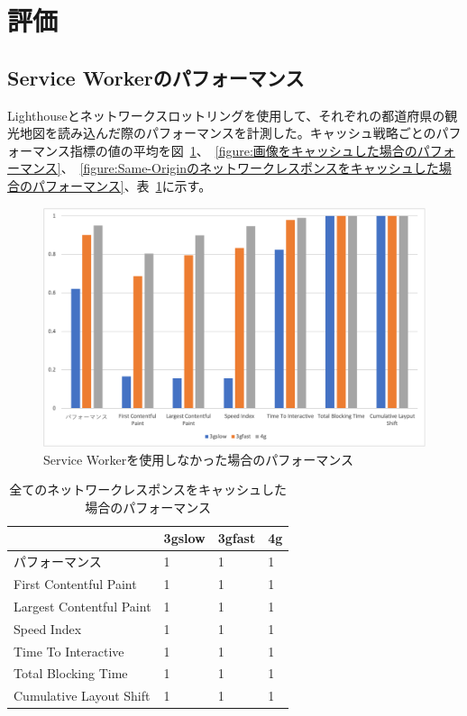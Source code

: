 \section{評価}
\label{section:評価}
\subsection{Service Workerのパフォーマンス}
\label{subsubsection:Service Workerのパフォーマンス}
Lighthouseとネットワークスロットリングを使用して、それぞれの都道府県の観光地図を読み込んだ際のパフォーマンスを計測した。キャッシュ戦略ごとのパフォーマンス指標の値の平均を図~\ref{figure:Service Workerを使用しなかった場合のパフォーマンス}、~\ref{figure:画像をキャッシュした場合のパフォーマンス}、~\ref{figure:Same-Originのネットワークレスポンスをキャッシュした場合のパフォーマンス}、表~\ref{table:全てのネットワークレスポンスをキャッシュした場合のパフォーマンス}に示す。
\begin{figure}
  \centering
  \includegraphics[width=\textwidth]{images/without_service_worker.png}
  \caption{Service Workerを使用しなかった場合のパフォーマンス}\label{figure:Service Workerを使用しなかった場合のパフォーマンス}
\end{figure}
\begin{table}
  \caption{全てのネットワークレスポンスをキャッシュした場合のパフォーマンス}
  \label{table:全てのネットワークレスポンスをキャッシュした場合のパフォーマンス}
  \centering
  \begin{tabular}{|p{15em}|p{5em}|p{5em}|p{5em}|}
    \hline
    & 3gslow & 3gfast & 4g \\ \hline
    パフォーマンス & 1 & 1 & 1 \\ \hline
    First Contentful Paint & 1 & 1 & 1 \\ \hline
    Largest Contentful Paint & 1 & 1 & 1 \\ \hline
    Speed Index & 1 & 1 & 1 \\ \hline
    Time To Interactive & 1 & 1 & 1 \\ \hline
    Total Blocking Time & 1 & 1 & 1 \\ \hline
    Cumulative Layout Shift & 1 & 1 & 1 \\ \hline
  \end{tabular}
\end{table}
